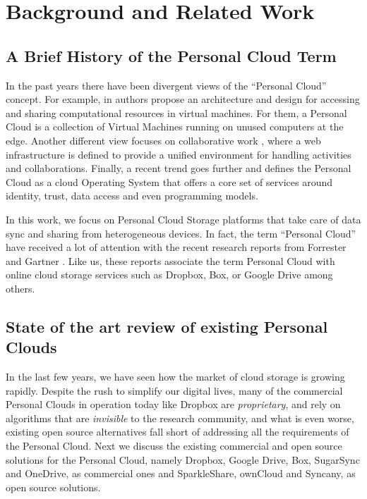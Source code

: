 \chapter{Background and Related Work}

\section{A Brief History of the Personal Cloud Term}

In the past years there have been divergent views of the ``Personal Cloud'' concept.  
For example, in \cite{hari2012personal} authors propose an architecture and design
for accessing and sharing computational resources in virtual machines. For them, a
Personal Cloud is a collection of Virtual Machines running on unused computers at the edge.
Another different view focuses on collaborative work \cite{ardissono2009service},  
where a web infrastructure is defined to provide a unified environment
for handling activities and collaborations. Finally, a recent trend \cite{windley}
 goes further and defines the Personal Cloud as a cloud Operating 
System that offers a core set of services around identity, trust, data access and 
even programming models.

In this work, we focus on Personal Cloud Storage platforms that take care of data
sync and sharing from heterogeneous devices. In fact,  the term ``Personal Cloud'' have
received a lot of attention with the recent research reports from Forrester \cite{forrester}
and Gartner \cite{gartner}. Like us, these reports associate the term Personal Cloud with
online cloud storage services such as Dropbox, Box, or Google Drive among others.

\section{State of the art review of existing Personal Clouds}

In the last few years, we have seen how the market of cloud storage is growing rapidly. 
Despite the rush to simplify our digital lives, many of the commercial Personal Clouds
in operation today like Dropbox are \textit{proprietary}, and rely on algorithms that are
\textit{invisible} to the research community, and what is even worse, existing open source
alternatives fall short of addressing all the requirements of the Personal Cloud.
Next we discuss the existing commercial and open source solutions for the Personal Cloud, namely
Dropbox, Google Drive, Box, SugarSync and OneDrive, as commercial ones and 
SparkleShare, ownCloud and Syncany, as open source solutions.

